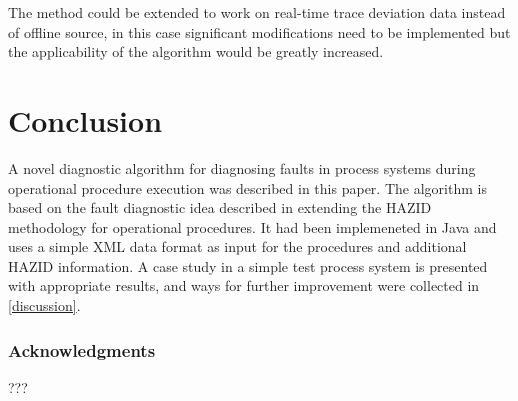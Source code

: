 \documentclass[conference]{IEEEtran}
\begin{document}
The method could be extended to work on real-time trace deviation data instead of offline source, in this case significant modifications need to be implemented but the applicability of the algorithm would be greatly increased.

\section{Conclusion}
A novel diagnostic algorithm for diagnosing faults in process systems during operational procedure execution was described in this paper. The algorithm is based on the fault diagnostic idea described in \cite{KES2011} extending the HAZID methodology for operational procedures. It had been implemeneted in Java and uses a simple XML data format as input for the procedures and additional HAZID information. A case study in a simple test process system is presented with appropriate results, and ways for further improvement were collected in \ref{discussion}.

\subsubsection{Acknowledgments}

???
\end{document}

